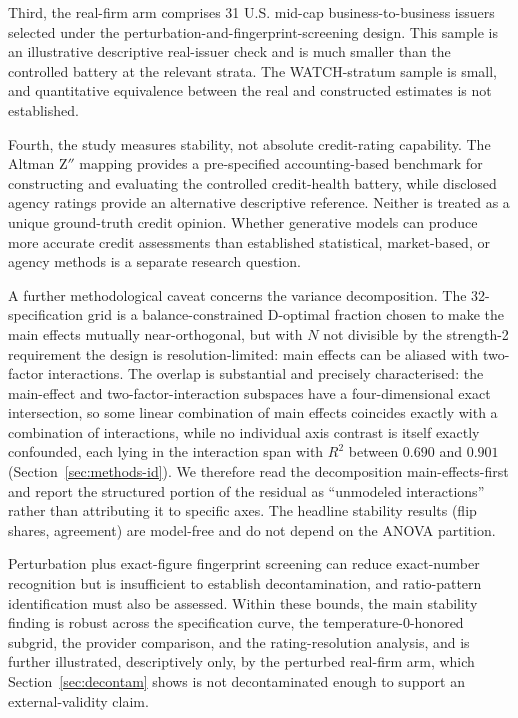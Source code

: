\documentclass[a4paper,fleqn]{cas-sc}
\begin{document}
Third, the real-firm arm comprises 31 U.S. mid-cap business-to-business issuers selected under the
perturbation-and-fingerprint-screening design. This sample is an illustrative descriptive real-issuer check and is much smaller than the
controlled battery at the relevant strata. The WATCH-stratum sample is small, and quantitative equivalence
between the real and constructed estimates is not established.

Fourth, the study measures stability, not absolute credit-rating capability. The Altman Z$''$ mapping
provides a pre-specified accounting-based benchmark for constructing and evaluating the controlled
credit-health battery, while disclosed agency ratings provide an alternative descriptive reference.
Neither is treated as a unique ground-truth credit opinion. Whether generative models can produce more
accurate credit assessments than established statistical, market-based, or agency methods is a separate
research question.

A further methodological caveat concerns the variance decomposition. The 32-specification grid is a
balance-constrained D-optimal fraction chosen to make the main effects mutually near-orthogonal, but with
$N$ not divisible by the strength-2 requirement the design is resolution-limited: main effects can be
aliased with two-factor interactions. The overlap is substantial and precisely characterised: the
main-effect and two-factor-interaction subspaces have a four-dimensional exact intersection, so some
linear combination of main effects coincides exactly with a combination of interactions, while no
individual axis contrast is itself exactly confounded, each lying in the interaction span with
$R^2$ between $0.690$ and $0.901$ (Section~\ref{sec:methods-id}). We therefore read the
decomposition main-effects-first
and report the structured portion of the residual as ``unmodeled interactions'' rather than attributing
it to specific axes. The headline stability results (flip shares, agreement) are model-free and do not
depend on the ANOVA partition.

Perturbation plus exact-figure fingerprint screening can reduce exact-number recognition but is insufficient to establish decontamination, and ratio-pattern identification must also be assessed. Within these bounds, the main stability finding is robust across the specification curve, the
temperature-0-honored subgrid, the provider comparison, and the rating-resolution analysis, and is further
illustrated, descriptively only, by the perturbed real-firm arm, which
Section~\ref{sec:decontam} shows is not decontaminated enough to support an external-validity
claim.
\end{document}
